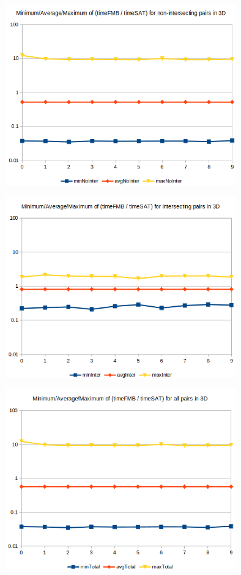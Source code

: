 \documentclass[12pt, a4paper]{article}
\begin{document}
\begin{center}
\begin{figure}[H]
\centering\includegraphics[width=10cm]{./3dnointer.png}\\
\end{figure}
\end{center}

\begin{center}
\begin{figure}[H]
\centering\includegraphics[width=10cm]{./3dinter.png}\\
\end{figure}
\end{center}

\begin{center}
\begin{figure}[H]
\centering\includegraphics[width=10cm]{./3dtotal.png}\\
\end{figure}
\end{center}
\end{document}

